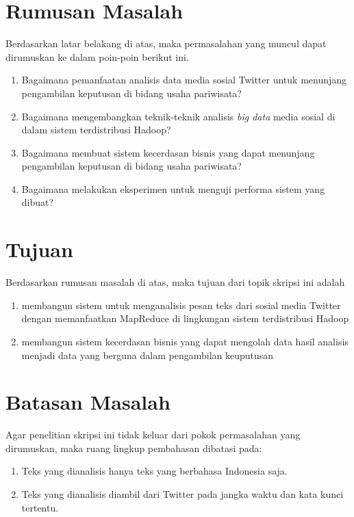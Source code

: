 \section{Rumusan Masalah}
\label{sec:rumusan_masalah}
Berdasarkan latar belakang di atas, maka permasalahan yang muncul dapat dirumuskan ke dalam poin-poin berikut ini.
\begin{enumerate}
	\item Bagaimana pemanfaatan analisis data media sosial Twitter untuk menunjang pengambilan keputusan di bidang usaha pariwisata?
	\item Bagaimana mengembangkan teknik-teknik analisis \textit{big data} media sosial di dalam sistem terdistribusi Hadoop?
	\item Bagaimana membuat sistem kecerdasan bisnis yang dapat menunjang pengambilan keputusan di bidang usaha pariwisata?
	\item Bagaimana melakukan eksperimen untuk menguji performa sistem yang dibuat?
\end{enumerate}

\section{Tujuan}
\label{sec:tujuan}
Berdasarkan rumusan masalah di atas, maka tujuan dari topik skripsi ini adalah 
\begin{enumerate}
	\item membangun sistem untuk menganalisis pesan teks dari sosial media Twitter dengan memanfaatkan MapReduce di lingkungan sistem terdistribusi Hadoop
	\item membangun sistem kecerdasan bisnis yang dapat mengolah data hasil analisis menjadi data yang berguna dalam pengambilan keuputusan
\end{enumerate}

\section{Batasan Masalah}
\label{sec:batasan_masalah}
Agar penelitian skripsi ini tidak keluar dari pokok permasalahan yang dirumuskan, maka ruang lingkup pembahasan dibatasi pada:
\begin{enumerate}
	\item Teks yang dianalisis hanya teks yang berbahasa Indonesia saja. 
	\item Teks yang dianalisis diambil dari Twitter pada jangka waktu dan kata kunci tertentu.
\end{enumerate}

